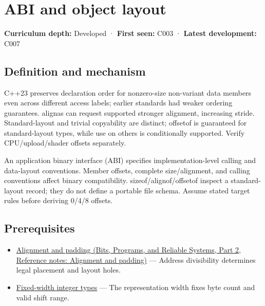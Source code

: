 \hypertarget{appendix-c4ac6bb0fff8}{}\label{referencestart:appendix-c4ac6bb0fff8}
\section{ABI and object layout}\label{appendix-c4ac6bb0fff8-abi-and-object-layout}

\hypertarget{appendix-c4ac6bb0fff8-abi-and-object-layout}{}

\textbf{Curriculum depth:} Developed · \textbf{First seen:} C003 · \textbf{Latest development:} C007

\begin{allmightroledefinition}

\subsection{Definition and mechanism}\label{appendix-c4ac6bb0fff8-definition-and-mechanism}

\hypertarget{appendix-c4ac6bb0fff8-definition-and-mechanism}{}

C++23 preserves declaration order for nonzero-size non-variant data members even across different access labels; earlier standards had weaker ordering guarantees. alignas can request supported stronger alignment, increasing stride. Standard-layout and trivial copyability are distinct; offsetof is guaranteed for standard-layout types, while use on others is conditionally supported. Verify CPU/upload/shader offsets separately.

\end{allmightroledefinition}

An application binary interface (ABI) specifies implementation-level calling and data-layout conventions. Member offsets, complete size/alignment, and calling conventions affect binary compatibility. sizeof/alignof/offsetof inspect a standard-layout record; they do not define a portable file schema. Assume stated target rules before deriving 0/4/8 offsets.

\subsection{Prerequisites}\label{appendix-c4ac6bb0fff8-prerequisites}

\hypertarget{appendix-c4ac6bb0fff8-prerequisites}{}

\begin{itemize}
\tightlist
\item
  \href{../01-Bits-Programs-and-Reliable-Systems-P02/main.pdf\#nameddest=appendix-a1f7c53b4742}{Alignment and padding (Bits, Programs, and Reliable Systems, Part 2, Reference notes: Alignment and padding)} --- Address divisibility determines legal placement and layout holes.
\item
  \hyperref[appendix-cc04044b5782]{Fixed-width integer types} --- The representation width fixes byte count and valid shift range.
\end{itemize}

